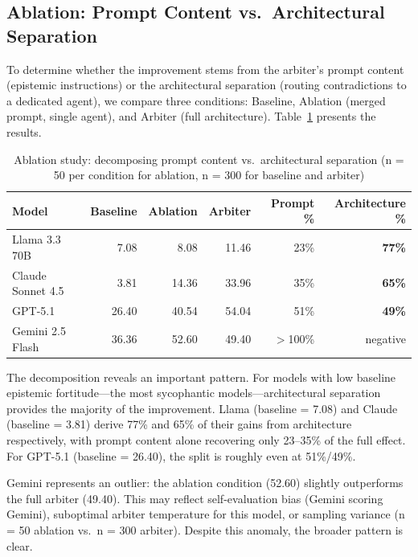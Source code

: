 \subsection{Ablation: Prompt Content vs.\ Architectural Separation}
\label{subsec:ablation}

To determine whether the improvement stems from the arbiter's prompt content (epistemic instructions) or the architectural separation (routing contradictions to a dedicated agent), we compare three conditions: Baseline, Ablation (merged prompt, single agent), and Arbiter (full architecture). Table~\ref{tab:ablation} presents the results.

\begin{table}[!ht]
\centering
\caption{Ablation study: decomposing prompt content vs.\ architectural separation (n = 50 per condition for ablation, n = 300 for baseline and arbiter)}
\label{tab:ablation}
\begin{tabular}{lrrrrr}
\toprule
\textbf{Model} & \textbf{Baseline} & \textbf{Ablation} & \textbf{Arbiter} & \textbf{Prompt \%} & \textbf{Architecture \%} \\
\midrule
Llama 3.3 70B & 7.08 & 8.08 & 11.46 & 23\% & \textbf{77\%} \\
Claude Sonnet 4.5 & 3.81 & 14.36 & 33.96 & 35\% & \textbf{65\%} \\
GPT-5.1 & 26.40 & 40.54 & 54.04 & 51\% & \textbf{49\%} \\
Gemini 2.5 Flash & 36.36 & 52.60 & 49.40 & $>$100\% & negative \\
\bottomrule
\end{tabular}
\end{table}

The decomposition reveals an important pattern. For models with low baseline epistemic fortitude---the most sycophantic models---architectural separation provides the majority of the improvement. Llama (baseline = 7.08) and Claude (baseline = 3.81) derive 77\% and 65\% of their gains from architecture respectively, with prompt content alone recovering only 23--35\% of the full effect. For GPT-5.1 (baseline = 26.40), the split is roughly even at 51\%/49\%.

Gemini represents an outlier: the ablation condition (52.60) slightly outperforms the full arbiter (49.40). This may reflect self-evaluation bias (Gemini scoring Gemini), suboptimal arbiter temperature for this model, or sampling variance (n = 50 ablation vs.\ n = 300 arbiter). Despite this anomaly, the broader pattern is clear.

